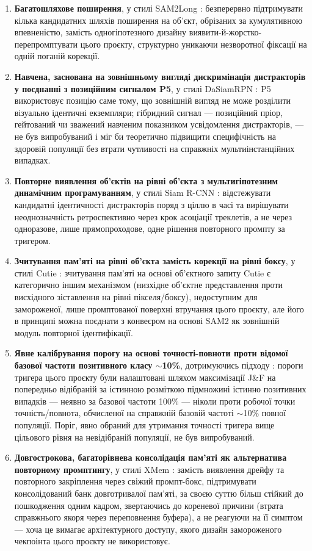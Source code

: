 \documentclass[11pt]{article}
\begin{document}
\begin{enumerate}
\item \textbf{Багатошляхове поширення}, у стилі SAM2Long \citep{ding2024}: безперервно підтримувати кілька кандидатних шляхів поширення на об'єкт, обрізаних за кумулятивною впевненістю, замість одногіпотезного дизайну виявити-й-жорстко-перепромптувати цього проєкту, структурно уникаючи незворотної фіксації на одній поганій корекції.
\item \textbf{Навчена, заснована на зовнішньому вигляді дискримінація дистракторів у поєднанні з позиційним сигналом P5}, у стилі DaSiamRPN \citep{zhu2018}: P5 використовує позицію саме тому, що зовнішній вигляд не може розділити візуально ідентичні екземпляри; гібридний сигнал --- позиційний пріор, гейтований чи зважений навченим показником усвідомлення дистракторів, --- не був випробуваний і міг би теоретично підвищити специфічність на здоровій популяції без втрати чутливості на справжніх мультиінстанційних випадках.
\item \textbf{Повторне виявлення об'єктів на рівні об'єкта з мультигіпотезним динамічним програмуванням}, у стилі Siam R-CNN \citep{voigtlaender2020}: відстежувати кандидатні ідентичності дистракторів поряд з ціллю в часі та вирішувати неоднозначність ретроспективно через крок асоціації треклетів, а не через одноразове, лише прямопроходове, одне рішення повторного промпту за тригером.
\item \textbf{Зчитування пам'яті на рівні об'єкта замість корекції на рівні боксу}, у стилі Cutie \citep{cheng2023cutie}: зчитування пам'яті на основі об'єктного запиту Cutie є категорично іншим механізмом (низхідне об'єктне представлення проти висхідного зіставлення на рівні пікселя/боксу), недоступним для замороженої, лише промптованої поверхні втручання цього проєкту, але його в принципі можна поєднати з конвеєром на основі SAM2 як зовнішній модуль повторної ідентифікації.
\item \textbf{Явне калібрування порогу на основі точності-повноти проти відомої базової частоти позитивного класу $\sim$10\%}, дотримуючись підходу \citet{saito2015}: пороги тригера цього проєкту були налаштовані шляхом максимізації J\&F на попередньо відібраній за істинною розміткою підмножині істинно позитивних випадків --- неявно за базової частоти 100\% --- ніколи проти робочої точки точність/повнота, обчисленої на справжній базовій частоті $\sim$10\% повної популяції. Поріг, явно обраний для утримання точності тригера вище цільового рівня на невідібраній популяції, не був випробуваний.
\item \textbf{Довгострокова, багаторівнева консолідація пам'яті як альтернатива повторному промптингу}, у стилі XMem \citep{cheng2022xmem}: замість виявлення дрейфу та повторного закріплення через свіжий промпт-бокс, підтримувати консолідований банк довготривалої пам'яті, за своєю суттю більш стійкий до пошкодження одним кадром, звертаючись до кореневої причини (втрата справжнього якоря через переповнення буфера), а не реагуючи на її симптом --- хоча це вимагає архітектурного доступу, якого дизайн замороженого чекпоінта цього проєкту не використовує.
\end{enumerate}
\end{document}
